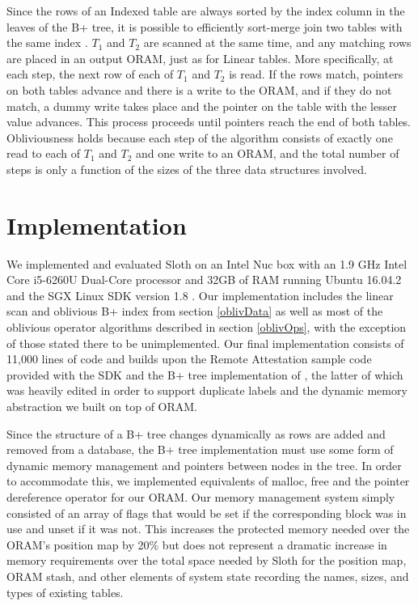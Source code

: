 \documentclass[USenglish,oneside,twocolumn]{article}
\def\name/{Sloth}
\begin{document}
Since the rows of an Indexed table are always sorted by the index column in the leaves of the B+ tree, it is possible to efficiently sort-merge join two tables with the same index \cite{EN10}. $T_1$ and $T_2$ are scanned at the same time, and any matching rows are placed in an output ORAM, just as for Linear tables. More specifically, at each step, the next row of each of $T_1$ and $T_2$ is read. If the rows match, pointers on both tables advance and there is a write to the ORAM, and if they do not match, a dummy write takes place and the pointer on the table with the lesser value advances. This process proceeds until pointers reach the end of both tables. Obliviousness holds because each step of the algorithm consists of exactly one read to each of $T_1$ and $T_2$ and one write to an ORAM, and the total number of steps is only a function of the sizes of the three data structures involved.  

\section{Implementation}\label{imp}
We implemented and evaluated \name/ on an Intel Nuc box with an 1.9 GHz Intel Core i5-6260U Dual-Core processor and 32GB of RAM running Ubuntu 16.04.2 and the SGX Linux SDK version 1.8 \cite{SGXRef}. Our implementation includes the linear scan and oblivious B+ index from section \ref{oblivData} as well as most of the oblivious operator algorithms described in section \ref{oblivOps}, with the exception of those stated there to be unimplemented. Our final implementation consists of 11,000 lines of code and builds upon the Remote Attestation sample code provided with the SDK and the B+ tree implementation of \cite{BPlus}, the latter of which was heavily edited in order to support duplicate labels and the dynamic memory abstraction we built on top of ORAM. 

Since the structure of a B+ tree changes dynamically as rows are added and removed from a database, the B+ tree implementation must use some form of dynamic memory management and pointers between nodes in the tree. In order to accommodate this, we implemented equivalents of malloc, free and the pointer dereference operator for our ORAM. Our memory management system simply consisted of an array of flags that would be set if the corresponding block was in use and unset if it was not. This increases the protected memory needed over the ORAM's position map by 20\% but does not represent a dramatic increase in memory requirements over the total space needed by \name/ for the position map, ORAM stash, and other elements of system state recording the names, sizes, and types of existing tables. 
\end{document}
